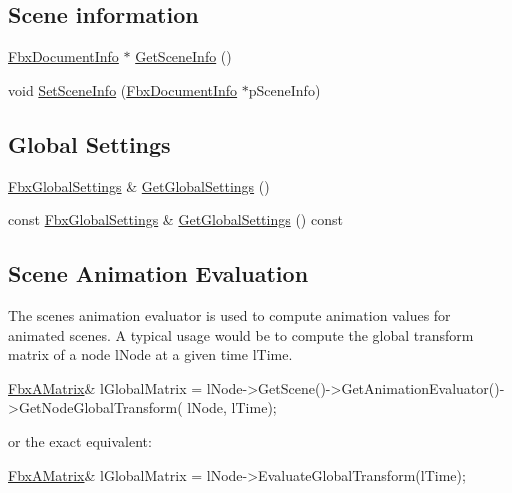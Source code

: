 \subsection*{Scene information}
\begin{DoxyCompactItemize}
\item 
\hyperlink{class_fbx_document_info}{Fbx\+Document\+Info} $\ast$ \hyperlink{class_fbx_scene_a5af52a77f2053fae74477261f857a0d8}{Get\+Scene\+Info} ()
\item 
void \hyperlink{class_fbx_scene_a486c147dc25d9bec4938852d2550cb81}{Set\+Scene\+Info} (\hyperlink{class_fbx_document_info}{Fbx\+Document\+Info} $\ast$p\+Scene\+Info)
\end{DoxyCompactItemize}
\subsection*{Global Settings}
\begin{DoxyCompactItemize}
\item 
\hyperlink{class_fbx_global_settings}{Fbx\+Global\+Settings} \& \hyperlink{class_fbx_scene_a0cb767181a743532c9e9be17f0348570}{Get\+Global\+Settings} ()
\item 
const \hyperlink{class_fbx_global_settings}{Fbx\+Global\+Settings} \& \hyperlink{class_fbx_scene_a223ba0266f854f8243f9f6b2350a9404}{Get\+Global\+Settings} () const
\end{DoxyCompactItemize}
\subsection*{Scene Animation Evaluation}
\label{_amgrp75977921e44cb3c6a8bcac7b5f40eafc}%
 The scene\textquotesingle{}s animation evaluator is used to compute animation values for animated scenes. A typical usage would be to compute the global transform matrix of a node {\ttfamily l\+Node} at a given time {\ttfamily l\+Time}. 
\begin{DoxyCode}
\hyperlink{class_fbx_a_matrix}{FbxAMatrix}& lGlobalMatrix = lNode->GetScene()->GetAnimationEvaluator()->GetNodeGlobalTransform(
      lNode, lTime);

or the exact equivalent:

\hyperlink{class_fbx_a_matrix}{FbxAMatrix}& lGlobalMatrix = lNode->EvaluateGlobalTransform(lTime);
\end{DoxyCode}


